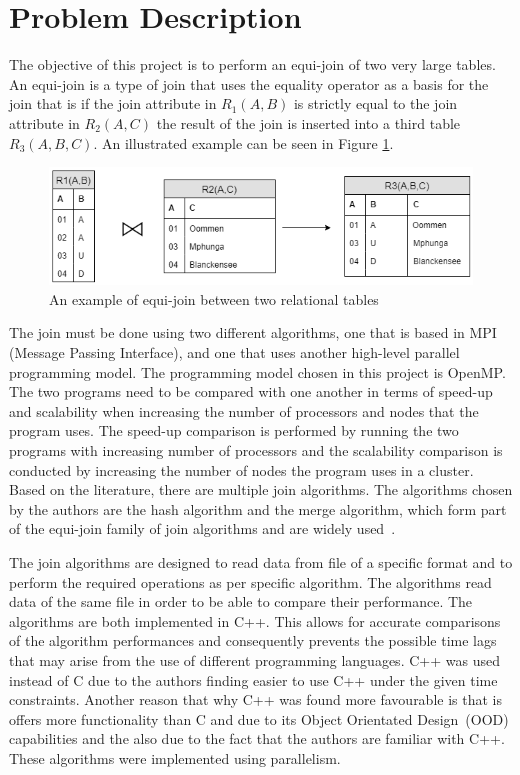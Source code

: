 \documentclass[journal,draftclsnofoot,11pt]{IEEEtran}
\begin{document}
\section{Problem Description}\label{prob}
The objective of this project is to perform an equi-join of two very large tables. An equi-join is a type of join that uses the equality operator as a basis for the join \cite{w3resource.com2018} that is if the join attribute in $R_{1}(A,B)$ is strictly equal to the join attribute in $R_{2}(A,C)$ the result of the join is inserted into a third table $R_{3}(A, B, C)$. An illustrated example can be seen in Figure \ref{fig:Equi-Join}.
\begin{figure}[htbp]
	\centering
		\includegraphics[width=1.00\textwidth]{Equi-Join.png}
	\caption{An example of equi-join between two relational tables}
	\label{fig:Equi-Join}
\end{figure}
The join must be done using two different algorithms, one that is based in MPI (Message Passing Interface), and one that uses another high-level parallel programming model. The programming model chosen in this project is OpenMP. The two programs need to be compared with one another in terms of speed-up and scalability when increasing the number of processors and nodes that the program uses. The speed-up comparison is performed by running the two programs with increasing number of processors and the scalability comparison is conducted by increasing the number of nodes the program uses in a cluster. Based on the literature, there are multiple join algorithms. The algorithms chosen by the authors are the hash algorithm and the merge algorithm, which form part of the equi-join family of join algorithms and are widely used~\cite{Wolf1993}.

The join algorithms are designed to read data from  file of a specific format and to perform the required operations as per specific algorithm. The algorithms read data of the same file in order to be able to compare their performance. The algorithms are both implemented in C++. This allows for accurate comparisons of the algorithm performances and consequently prevents the possible time lags that may arise from the use of different programming languages. C++ was used instead of C due to the authors finding easier to use C++ under the given time constraints. Another reason that why C++ was found more favourable is that is offers more functionality than C and due to its Object Orientated Design~(OOD) capabilities and the also due to the fact that the authors are familiar with C++. These algorithms were implemented using parallelism.
\end{document}
